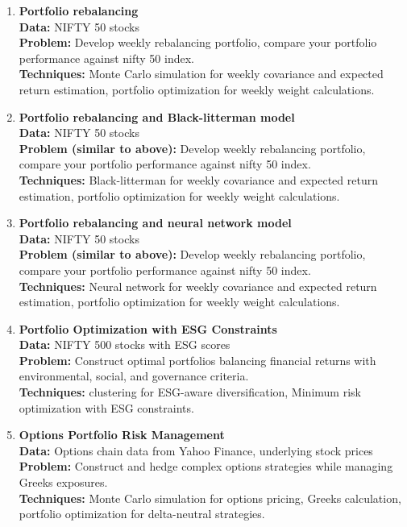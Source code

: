 \documentclass{article}
\begin{document}
\begin{enumerate}

\item \textbf{Portfolio rebalancing} \\
\textbf{Data:} NIFTY 50 stocks \\
\textbf{Problem:} Develop weekly rebalancing portfolio, compare your portfolio performance against nifty 50 index. \\
\textbf{Techniques:} Monte Carlo simulation for weekly covariance and expected return estimation, portfolio optimization for weekly weight calculations.

\item \textbf{Portfolio rebalancing and Black-litterman model} \\
\textbf{Data:} NIFTY 50 stocks \\
\textbf{Problem (similar to above):} Develop weekly rebalancing portfolio, compare your portfolio performance against nifty 50 index. \\
\textbf{Techniques:} Black-litterman for weekly covariance and expected return estimation, portfolio optimization for weekly weight calculations.

\item \textbf{Portfolio rebalancing and neural network model} \\
\textbf{Data:} NIFTY 50 stocks \\
\textbf{Problem (similar to above):} Develop weekly rebalancing portfolio, compare your portfolio performance against nifty 50 index. \\
\textbf{Techniques:} Neural network for weekly covariance and expected return estimation, portfolio optimization for weekly weight calculations.

\item \textbf{Portfolio Optimization with ESG Constraints} \\
\textbf{Data:} NIFTY 500 stocks with ESG scores \\
\textbf{Problem:} Construct optimal portfolios balancing financial returns with environmental, social, and governance criteria. \\
\textbf{Techniques:} clustering for ESG-aware diversification, Minimum risk optimization with ESG constraints.

\item \textbf{Options Portfolio Risk Management} \\
\textbf{Data:} Options chain data from Yahoo Finance, underlying stock prices \\
\textbf{Problem:} Construct and hedge complex options strategies while managing Greeks exposures. \\
\textbf{Techniques:} Monte Carlo simulation for options pricing, Greeks calculation, portfolio optimization for delta-neutral strategies.


\end{enumerate}
\end{document}
